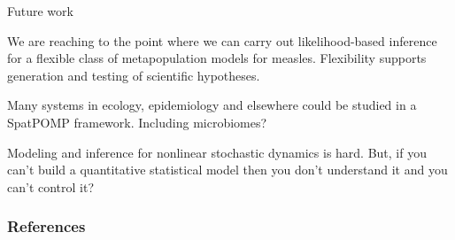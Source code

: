 \documentclass{beamer}
\begin{document}
\begin{frame}{Future work}

  \newcommand\futuresep{\vspace{3mm}}
  
  \begin{myitemize}
  \item We are reaching to the point where we can carry out likelihood-based inference for a flexible class of metapopulation models for measles.
Flexibility supports generation and testing of scientific hypotheses.
        
    \futuresep
    

    \futuresep
    
  \item Many systems in ecology, epidemiology and elsewhere could be studied in a SpatPOMP framework. Including microbiomes?

     \futuresep

   \item Modeling and inference for nonlinear stochastic dynamics is hard. But, if you can't build a quantitative statistical model then you don't understand it and you can't control it?
    
\end{myitemize}

\end{frame}

\nocite{bjornstad01,grenfell04,breto19,rebeschini15,ng02,ionides21}

\begin{frame}[allowframebreaks]
\frametitle{References}


\end{frame}

\end{document}
